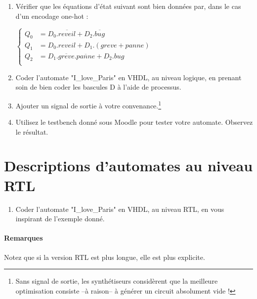 \documentclass[a4paper,11pt]{article}
\begin{document}
\begin{enumerate}
  \item Vérifier que les équations d'état suivant sont bien données par, dans le cas d'un encodage one-hot :

  $\left\{
  \begin{array}{rl}
    Q_0 &= D_0.\overline{reveil}+D_2.\overline{bug} \\
    Q_1 &= D_0.reveil+D_1.(greve+panne)\\
    Q_2 &= D_1.\overline{greve}.\overline{panne}+D_2.bug\\
  \end{array}
  \right.$

  \item Coder l'automate "I\_love\_Paris" en VHDL, au niveau logique, en prenant soin de bien coder les bascules D à l'aide de processus.
  

  \item Ajouter un signal de sortie à votre convenance.\footnote{Sans signal de sortie, les synthétiseurs considèrent que la meilleure optimisation
  consiste --à raison-- à générer un circuit absolument vide !}
  \item Utilisez le testbench donné sous Moodle pour tester votre automate. Observez le résultat.
\end{enumerate}

\section{Descriptions d'automates au niveau RTL}


\begin{enumerate}
  \item Coder l'automate "I\_love\_Paris" en VHDL, au niveau RTL, en vous inspirant de l'exemple donné.
\end{enumerate}




\paragraph{Remarques}
Notez que si la version RTL est plus longue, elle est plus explicite.
\end{document}
